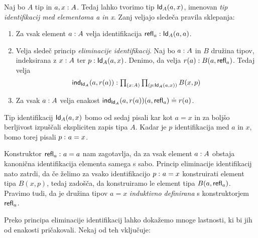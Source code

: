 \begin{definicija}
  Naj bo \(A\) tip in \(a, x : A\). Tedaj lahko tvorimo tip
  \(\textnormal{\textsf{Id}}_{A}(a, x)\),
  imenovan \emph{tip identifikacij med elementoma a in x}. Zanj veljajo sledeča pravila
  sklepanja:
  \begin{enumerate}
  \item Za vsak element \(a : A\) velja identifikacija
    \(\textnormal{\textsf{refl}}_{a} : \textnormal{\textsf{Id}}_{A}(a, a)\).
  \item Velja sledeč princip \emph{eliminacije identifikacij}.
    Naj bo \(a : A\) in \(B\) družina tipov, indeksirana z
    \(x : A\) ter \(p : \textnormal{\textsf{Id}}_{A}(a, x)\). Denimo, da velja
    \(r(a) : B(a, \textnormal{\textsf{refl}}_{a})\). Tedaj velja
    \[\textnormal{\textsf{ind}}_{\textnormal{\textsf{Id}}_{A}}(a, r(a)) : \textstyle \prod_{\left( x : A \right)} \textstyle \prod_{\left( p : \textnormal{\textsf{Id}}_{A}(a, x) \right)} B(x, p)\]
  \item Za vsak \(a : A\) velja enakost
    \(\textnormal{\textsf{ind}}_{\textnormal{\textsf{Id}}_{A}}(a, r(a))(a, \textnormal{\textsf{refl}}_{a}) \doteq r(a)\).
  \end{enumerate}
  Tip identifikacij \(\textnormal{\textsf{Id}}_{A}(a, x)\) bomo od sedaj pisali kar kot \(a = x\) in za boljšo
  berljivost izpuščali ekspliciten zapis tipa \(A\). Kadar je \(p\) identifikacija
  med \(a\) in \(x\), bomo torej pisali \(p \,\colon a = x\).

  Konstruktor \(\textnormal{\textsf{refl}}_{a} \,\colon a = a\)
  nam zagotavlja, da za vsak element \(a : A\) obstaja kanonična
  identifikacija elementa samega s sabo. Princip eliminacije identifikacij nato zatrdi,
  da če želimo za vsako identifikacijo \(p \,\colon a = x\) konstruirati element tipa
  \(B(x, p)\), tedaj zadošča, da konstruiramo le element tipa \(B(a, \textnormal{\textsf{refl}}_{a})\).
  Pravimo tudi, da je družina tipov \(a = x\) \emph{induktivno definirana} s
  konstruktorjem \(\textnormal{\textsf{refl}}_{a}\).
\end{definicija}

Preko principa eliminacije identifikacij lahko dokažemo mnoge lastnosti, ki bi jih od enakosti pričakovali. Nekaj od teh vključuje:

